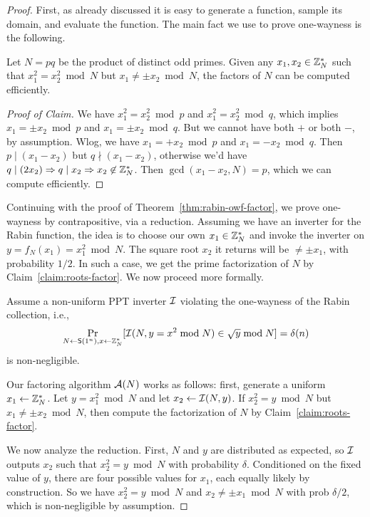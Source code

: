 \documentclass[11pt]{article}
\begin{document}
\begin{proof}
  First, as already discussed it is easy to generate a function,
  sample its domain, and evaluate the function.  The main fact we use
  to prove one-wayness is the following.

  \begin{claim}
    \label{claim:roots-factor}
    Let $N = pq$ be the product of distinct odd primes.  Given any
    $x_{1}, x_{2} \in \mathbb{Z}_N^{*}$ such that $x_{1}^{2} = x_{2}^{2} \bmod
    N$ but $x_{1} \neq \pm x_{2} \bmod N$, the factors of $N$ can be
    computed efficiently.
  \end{claim}

  \begin{proof}[Proof of Claim]
    We have $x_{1}^{2} = x_{2}^{2} \bmod p$ and $x_{1}^{2} = x_{2}^{2}
    \bmod q$, which implies $x_{1} = \pm x_{2} \bmod p$ and $x_{1} =
    \pm x_{2} \bmod q$.  But we cannot have both $+$ or both $-$, by
    assumption.  Wlog, we have $x_{1} = + x_{2} \bmod p$ and $x_{1} =
    - x_{2} \bmod q$.  Then $p \mid (x_{1}-x_{2})$ but $q \nmid
    (x_{1}-x_{2})$, otherwise we'd have $q \mid (2x_{2}) \Rightarrow q
    \mid x_{2} \Rightarrow x_{2} \not\in \mathbb{Z}_N^{*}$.  Then
    $\gcd(x_{1}-x_{2},N) = p$, which we can compute efficiently.
  \end{proof}

  Continuing with the proof of Theorem~\ref{thm:rabin-owf-factor}, we
  prove one-wayness by contrapositive, via a reduction.  Assuming we
  have an inverter for the Rabin function, the idea is to choose our
  own $x_{1} \in \mathbb{Z}_N^{*}$ and invoke the inverter on $y = f_{N}(x_{1})
  = x_{1}^{2} \bmod N$.  The square root $x_{2}$ it returns will be
  $\neq \pm x_{1}$, with probability $1/2$.  In such a case, we get
  the prime factorization of $N$ by Claim~\ref{claim:roots-factor}.
  We now proceed more formally.

  Assume a non-uniform PPT inverter $\mathcal{I}$ violating the one-wayness
  of the Rabin collection, i.e., \[ \Pr_{N \gets \mathsf{S}(1^{n}), x
    \gets \mathbb{Z}_N^{*}}[\mathcal{I}(N, y = x^{2} \bmod N) \in \sqrt{y} \bmod N] =
  \delta(n) \] is non-negligible.

  Our factoring algorithm $\mathcal{A}(N)$ works as follows: first, generate
  a uniform $x_{1} \gets \mathbb{Z}_N^{*}$.  Let $y = x_{1}^{2} \bmod N$ and
  let $x_{2} \gets \mathcal{I}(N, y)$.  If $x_{2}^{2} = y \bmod N$ but $x_{1}
  \neq \pm x_{2} \bmod N$, then compute the factorization of $N$ by
  Claim~\ref{claim:roots-factor}.

  We now analyze the reduction.  First, $N$ and $y$ are distributed as
  expected, so $\mathcal{I}$ outputs $x_{2}$ such that $x_{2}^{2} = y \bmod
  N$ with probability $\delta$.  Conditioned on the fixed value of
  $y$, there are four possible values for $x_{1}$, each equally likely
  by construction.  So we have $x_{2}^{2} = y \bmod N$ and $x_{2} \neq
  \pm x_{1} \bmod N$ with prob $\delta/2$, which is non-negligible by
  assumption.
\end{proof}
\end{document}
